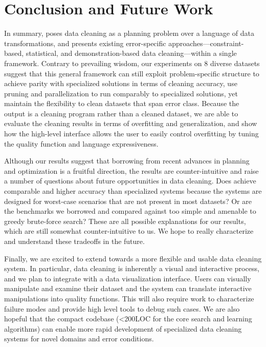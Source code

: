 \section{Conclusion and Future Work}
In summary, \sys poses data cleaning as a planning problem over a language of data transformations, and presents existing error-specific approaches---constraint-based, statistical, and demonstration-based data cleaning---within a single framework.
Contrary to prevailing wisdom, our experiments on 8 diverse datasets suggest that this general framework can still exploit problem-specific structure to achieve parity with specialized solutions in terms of cleaning accuracy, use pruning and parallelization to run comparably to specialized solutions, yet maintain the flexibility to clean datasets that span error class.       
Because the output is a cleaning program rather than a cleaned dataset, we are able to evaluate the cleaning results in terms of overfitting and generalization, and show how the high-level interface allows the user to easily control overfitting by tuning the quality function and language expressiveness.  

Although our results suggest that borrowing from recent advances in planning and optimization is a fruitful direction, the results are counter-intuitive and raise a number of questions about future opportunities in data cleaning.  Does \sys achieve comparable and higher accuracy than specialized systems because the systems are designed for worst-case scenarios that are not present in most datasets?  Or are the benchmarks we borrowed and compared against too simple and amenable to greedy brute-force search?  
These are all possible explanations for our results, which are still somewhat counter-intuitive to us.
We hope to really characterize and understand these tradeoffs in the future.

Finally, we are excited to extend \sys towards a more flexible and usable data cleaning system.  In particular, data cleaning is inherently a visual and interactive process, and we plan to integrate \sys with a data visualization interface.   Users can visually manipulate and examine their dataset and the system can translate interactive manipulations into quality functions.  This will also require work to characterize failure modes and provide high level tools to debug such cases.  We are also hopeful that the compact codebase (<200LOC for the core search and learning algorithms) can enable more rapid development of specialized data cleaning systems for novel domains and error conditions.  




